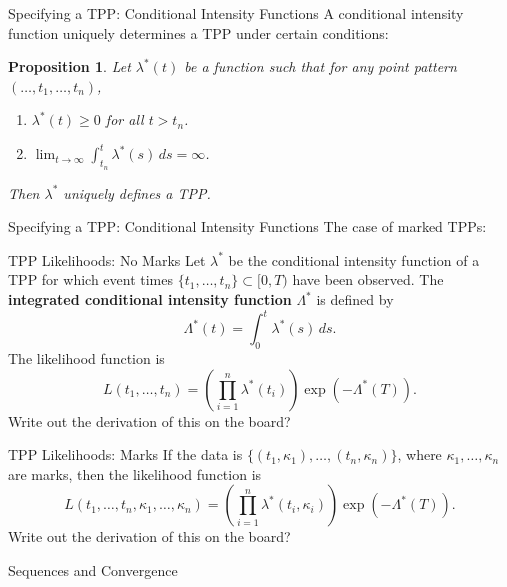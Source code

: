 \documentclass{beamer}
\newtheorem{proposition}{Proposition}
\begin{document}
\begin{frame}{Specifying a TPP: Conditional Intensity Functions}
    A conditional intensity function uniquely determines a TPP under certain conditions:
    \begin{proposition}
        Let $\lambda^*(t)$ be a function such that for any point pattern $(\ldots, t_1, \ldots, t_n)$,
        \begin{enumerate}
            \item $\lambda^*(t) \ge 0$ for all $t > t_n$.
            \item $\lim_{t \to \infty} \int_{t_n}^t \lambda^*(s)\,ds = \infty$.
        \end{enumerate}
        Then $\lambda^*$ uniquely defines a TPP.
    \end{proposition}
\end{frame}

\begin{frame}{Specifying a TPP: Conditional Intensity Functions}
    The case of marked TPPs:
\end{frame}

\begin{frame}{TPP Likelihoods: No Marks}
    Let $\lambda^*$ be the conditional intensity function of a TPP for which event times $\{t_1, \ldots, t_n\} \subset [0, T)$ have been observed. The \textbf{integrated conditional intensity function} $\Lambda^*$ is defined by
    \[
    \Lambda^*(t) = \int_0^t \lambda^*(s)\,ds.
    \]
    The likelihood function is
    \[
    L(t_1, \ldots, t_n) = \left(\prod_{i = 1}^n \lambda^*(t_i)\right)\exp(-\Lambda^*(T)).
    \]
    {\color{red} Write out the derivation of this on the board?}
\end{frame}

\begin{frame}{TPP Likelihoods: Marks}
    If the data is $\{(t_1, \kappa_1), \ldots, (t_n, \kappa_n)\}$, where $\kappa_1, \ldots, \kappa_n$ are marks, then the likelihood function is
    \[
    L(t_1, \ldots, t_n, \kappa_1, \ldots, \kappa_n) = \left(\prod_{i = 1}^n \lambda^*(t_i, \kappa_i)\right)\exp(-\Lambda^*(T)).
    \]
    {\color{red} Write out the derivation of this on the board?}
\end{frame}

\begin{frame}{Sequences and Convergence}
    
\end{frame}
\end{document}
